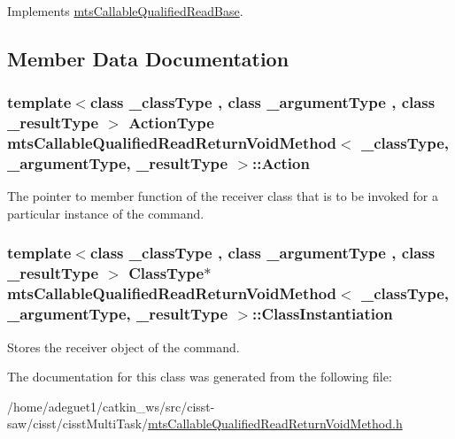 Implements \hyperlink{classmts_callable_qualified_read_base_af01602ea4eb94bf074f6e44ff3db2737}{mts\-Callable\-Qualified\-Read\-Base}.



\subsection{Member Data Documentation}
\hypertarget{classmts_callable_qualified_read_return_void_method_ac7d58d66c42aa3c1071a121762b2d7fb}{
\subsubsection[{Action}]{\setlength{\rightskip}{0pt plus 5cm}template$<$class \-\_\-class\-Type , class \-\_\-argument\-Type , class \-\_\-result\-Type $>$ {\bf Action\-Type} {\bf mts\-Callable\-Qualified\-Read\-Return\-Void\-Method}$<$ \-\_\-class\-Type, \-\_\-argument\-Type, \-\_\-result\-Type $>$\-::Action\hspace{0.3cm}{\ttfamily [protected]}}}\label{classmts_callable_qualified_read_return_void_method_ac7d58d66c42aa3c1071a121762b2d7fb}
The pointer to member function of the receiver class that is to be invoked for a particular instance of the command. \hypertarget{classmts_callable_qualified_read_return_void_method_ace93cdd3d5c06f66479ab1e1cd29ece3}{
\subsubsection[{Class\-Instantiation}]{\setlength{\rightskip}{0pt plus 5cm}template$<$class \-\_\-class\-Type , class \-\_\-argument\-Type , class \-\_\-result\-Type $>$ {\bf Class\-Type}$\ast$ {\bf mts\-Callable\-Qualified\-Read\-Return\-Void\-Method}$<$ \-\_\-class\-Type, \-\_\-argument\-Type, \-\_\-result\-Type $>$\-::Class\-Instantiation\hspace{0.3cm}{\ttfamily [protected]}}}\label{classmts_callable_qualified_read_return_void_method_ace93cdd3d5c06f66479ab1e1cd29ece3}
Stores the receiver object of the command. 

The documentation for this class was generated from the following file\-:\begin{DoxyCompactItemize}
\item 
/home/adeguet1/catkin\-\_\-ws/src/cisst-\/saw/cisst/cisst\-Multi\-Task/\hyperlink{mts_callable_qualified_read_return_void_method_8h}{mts\-Callable\-Qualified\-Read\-Return\-Void\-Method.\-h}\end{DoxyCompactItemize}
